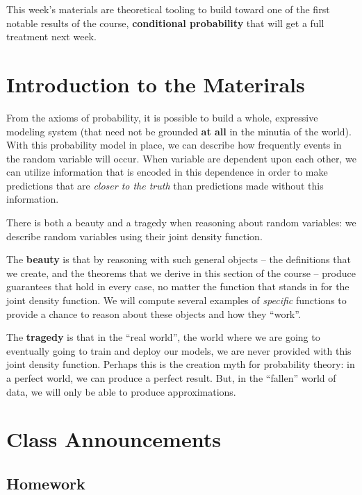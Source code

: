 \documentclass[
]{book}
\theoremstyle{definition}
\theoremstyle{definition}
\theoremstyle{definition}
\theoremstyle{definition}
\theoremstyle{remark}
\begin{document}
This week's materials are theoretical tooling to build toward one of the first notable results of the course, \textbf{conditional probability} that will get a full treatment next week.

\hypertarget{introduction-to-the-materirals}{%
\section{Introduction to the Materirals}\label{introduction-to-the-materirals}}

From the axioms of probability, it is possible to build a whole, expressive modeling system (that need not be grounded \textbf{at all} in the minutia of the world). With this probability model in place, we can describe how frequently events in the random variable will occur. When variable are dependent upon each other, we can utilize information that is encoded in this dependence in order to make predictions that are \emph{closer to the truth} than predictions made without this information.

There is both a beauty and a tragedy when reasoning about random variables: we describe random variables using their joint density function.

The \textbf{beauty} is that by reasoning with such general objects -- the definitions that we create, and the theorems that we derive in this section of the course -- produce guarantees that hold in every case, no matter the function that stands in for the joint density function. We will compute several examples of \emph{specific} functions to provide a chance to reason about these objects and how they ``work''.

The \textbf{tragedy} is that in the ``real world'', the world where we are going to eventually going to train and deploy our models, we are never provided with this joint density function. Perhaps this is the creation myth for probability theory: in a perfect world, we can produce a perfect result. But, in the ``fallen'' world of data, we will only be able to produce approximations.

\hypertarget{class-announcements}{%
\section{Class Announcements}\label{class-announcements}}

\hypertarget{homework}{%
\subsection*{Homework}\label{homework}}
\end{document}
